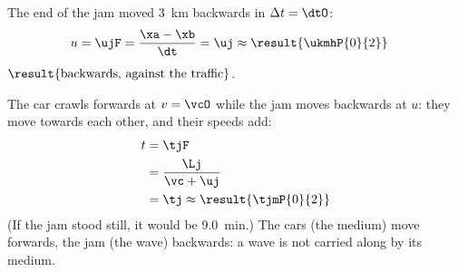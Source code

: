 \begin{abcliste}
\abc The end of the jam moved \SI{3}{\km} backwards in $\Delta t = \dtO$:
\begin{align}
 u &= \ujF = \frac{\xa-\xb}{\dt} = \uj \approx \result{\ukmhP{0}{2}}
\end{align}
$\result{\text{backwards, against the traffic}}$.

\abc The car crawls forwards at $v = \vcO$ while the jam moves backwards at $u$: they move towards each other, and their speeds add:
\begin{align}
 t &= \tjF \\
   &= \frac{\Lj}{\vc+\uj} \\
   &= \tj \approx \result{\tjmP{0}{2}}
\end{align}
(If the jam stood still, it would be \SI{9.0}{\minute}.) The cars (the medium) move forwards, the jam (the wave) backwards: a wave is not carried along by its medium.
\end{abcliste}
